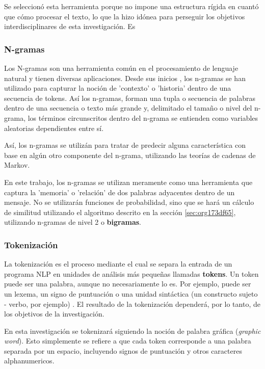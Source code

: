 \documentclass[12pt,letterpaper,twoside]{article}
\begin{document}
Se seleccionó esta herramienta porque no impone una estructura
rígida en cuantó que cómo procesar el texto, lo que la hizo
idónea para perseguir los objetivos interdisciplinares de esta
investigación. Es

\subsubsection{N-gramas}
\label{sec:org8e14515}

Los N-gramas son una herramienta común en el procesamiento
de lenguaje natural y tienen diversas aplicaciones. Desde sus
inicios \cite{manning1999foundations}, los n-gramas se han
utilizado para capturar la noción de 'contexto' o 'historia'
dentro de una secuencia de tokens. Así los n-gramas, forman
una tupla o secuencia de palabras dentro de una secuencia
o texto más grande y, delimitado el tamaño o nivel del
n-grama, los términos circunscritos dentro del n-grama
se entienden como variables aleatorias dependientes entre sí.

Así, los n-gramas se utilizán para tratar de predecir alguna
característica con base en algún otro componente del n-grama,
utilizando las teorías de cadenas de Markov.

En este trabajo, los n-gramas se utilizan meramente
como una herramienta que captura la 'memoria' o 'relación'
de dos palabras adyacentes dentro de un mensaje. No se
utilizarán funciones de probabilidad, sino que se hará
un cálculo de similitud utilizando el algoritmo descrito
en la sección  \ref{sec:org173df65}, utilizando
n-gramas de nivel 2 o \textbf{bigramas}.


\subsubsection{Tokenización}
\label{sec:org33d1288}
La tokenización es el proceso mediante el cual se separa la entrada
de un programa NLP en unidades de análisis más pequeñas llamadas
\textbf{tokens}. Un token puede ser una palabra, aunque no necesariamente
lo es. Por ejemplo, puede ser un lexema, un signo de puntuación
o una unidad sintáctica (un constructo sujeto - verbo, por ejemplo)
\cite{manning1999foundations}. El resultado de la tokenización
dependerá, por lo tanto, de los objetivos de la investigación.

En esta investigación se tokenizará siguiendo la noción de
palabra gráfica (\emph{graphic word}). Esto simplemente se refiere
a que cada token corresponde a una palabra separada por un espacio,
incluyendo signos de puntuación y otros caracteres alphanumericos.
\end{document}
